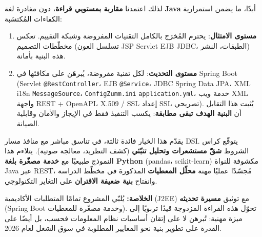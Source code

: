 لذلك اعتمدنا \textbf{مقاربة بمستويي قراءة}، دون مغادرة لغة \textbf{Java} أبدًا،
ما يضمن استمرارية الكفاءات المُكتسَبة:
\begin{enumerate}
  \item \textbf{مستوى الامتثال}: يحترم المُخرَج بالكامل التقنيات المفروضة وشبكة
        التقييم. تعكس مخطّطات التصميم (تسلسل العون \textrightarrow{} JSP
        \textrightarrow{} Servlet \textrightarrow{} EJB \textrightarrow{} JDBC،
        الطبقات، النشر) هذه البنية بأمانة.
  \item \textbf{مستوى التحديث}: لكل تقنية مفروضة، يُبرهَن على مكافئها في Spring
        Boot (Servlet \textrightarrow{} \texttt{@RestController}، EJB
        \textrightarrow{} \texttt{@Service}، JDBC \textrightarrow{} Spring Data
        JPA، XML i18n \textrightarrow{} \texttt{MessageSource}،
        \texttt{ConfigZumm.ini} \textrightarrow{} \texttt{application.yml}، خدمة
        ويب XML \textrightarrow{} واجهة REST + OpenAPI، X.509 / SSL
        \textrightarrow{} إعداد SSL تصريحي). يُثبت هذا التقابل أن \textbf{البنية
        الهدف تبقى مطابقة}: يكسب التنفيذ فقط في الإيجاز والأمان وقابلية الصيانة.
\end{enumerate}

يقدّم هذا الخيار فائدة ثالثة، في تناسق مباشر مع منافذ مسار DSI. يتوقّع كراس
الشروط \textbf{شقّ مستشعرات وتحليل تنبّئي} (كشف التطريد، معالجة صوتية). يتلاءم هذا
النموذج طبيعيًا مع \textbf{خدمة مصغّرة بلغة Python} (pandas، scikit-learn)
مكشوفة للنواة Java عبر REST، مُجسّدًا عمليًا مهنة \textbf{محلّل المعطيات} المذكورة
في مخطّط الدراسة وانفتاح \textbf{بنية ضعيفة الاقتران} على التغاير التكنولوجي.

\begin{encadre}
\textbf{الخلاصة:} يُلبّي المشروع تمامًا المتطلبات الأكاديمية (J2EE) مع توثيق
\textbf{مسيرة تحديثه} (Spring Boot وخدمة مصغّرة للمعطيات). تحوّل هذه القراءة
المزدوجة قيدًا تربويًا إلى ميزة مهنية: تُبرهن لا على إتقان أساسيات نظام المعلومات
فحسب، بل أيضًا على القدرة على تطوير بنية نحو المعايير المطلوبة في سوق الشغل لعام
2026.
\end{encadre}
